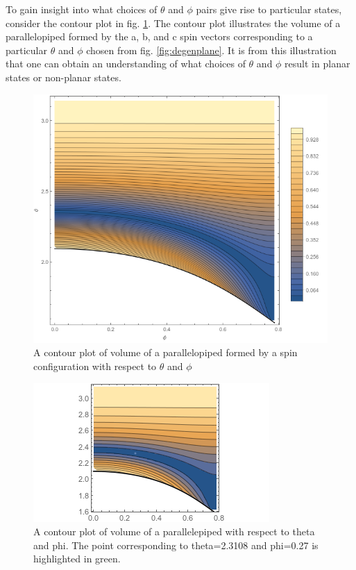 To gain insight into what choices of $\theta$ and $\phi$ pairs give rise to particular states, consider the contour plot in fig. \ref{fig:gsvol}. The contour plot illustrates the volume of a parallelopiped formed by the a, b, and c spin vectors corresponding to a particular $\theta$ and $\phi$ chosen from fig. \ref{fig:degenplane}. It is from this illustration that one can obtain an understanding of what choices of $\theta$ and $\phi$ result in planar states or non-planar states.


\begin{figure}[ht]
	\includegraphics[width=\linewidth]{img/groundstatevol.png}
	\caption{A contour plot of volume of a parallelopiped formed by a spin configuration with respect to $\theta$ and $\phi$ }
	\label{fig:gsvol}
\end{figure}
\clearpage

\begin{figure}[ht]
\centering
	\includegraphics[scale=1.3]{img/th2-3108_phi0-27_plane.png}
	\caption{A contour plot of volume of a parallelepiped with respect to theta and phi. The point corresponding to theta=2.3108 and phi=0.27 is highlighted in green.}
	\label{fig:volplane_ex}
\end{figure}

